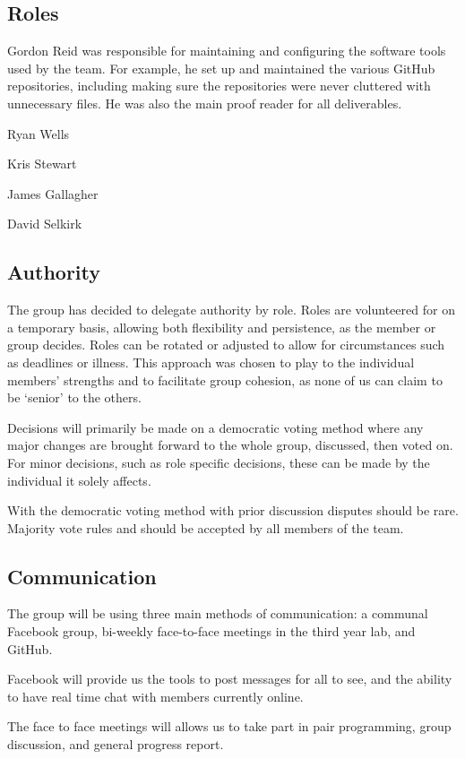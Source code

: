 \subsection{Roles}
Gordon Reid was responsible for maintaining and configuring the software tools
used by the team. For example, he set up and maintained the various GitHub
repositories, including making sure the repositories were never cluttered
with unnecessary files. He was also the main proof reader for all
deliverables.

Ryan Wells

Kris Stewart

James Gallagher

David Selkirk

\subsection{Authority}

The group has decided to delegate authority by role. Roles are volunteered for
on a temporary basis, allowing both flexibility and persistence, as the
member or group decides. Roles can be rotated or adjusted to allow for
circumstances such as deadlines or illness. This approach was chosen to play
to the individual members' strengths and to facilitate group cohesion, as none
of us can claim to be `senior' to the others.

Decisions will primarily be made on a democratic voting method where any
major changes are brought forward to the whole group, discussed, then voted
on. For minor decisions, such as role specific decisions, these can be made
by the individual it solely affects.

With the democratic voting method with prior discussion disputes should be
rare. Majority vote rules and should be accepted by all members of the team.

\subsection{Communication}

The group will be using three main methods of communication: a communal
Facebook group, bi-weekly face-to-face meetings in the third year lab,
and GitHub.

Facebook will provide us the tools to post messages for all to see, and the
ability to have real time chat with members currently online.

The face to face meetings will allows us to take part in pair programming,
group discussion, and general progress report.


